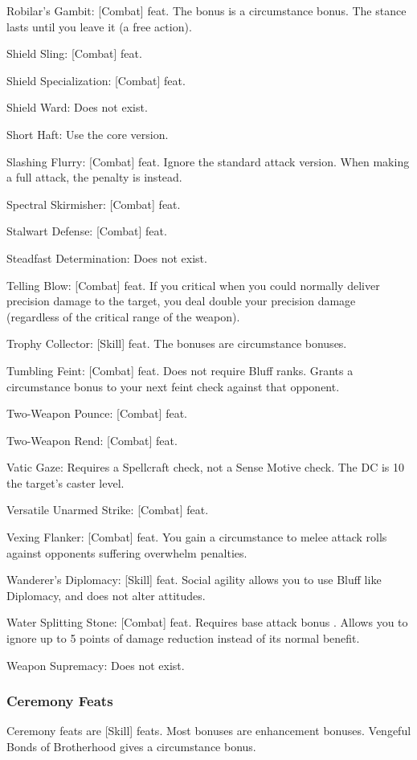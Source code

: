\begin{itemize*}
\item Robilar's Gambit: [Combat] feat. The bonus is a circumstance bonus. The stance lasts until you leave it (a free action).
\item Shield Sling: [Combat] feat.
\item Shield Specialization: [Combat] feat.
\item Shield Ward: Does not exist.
\item Short Haft: Use the core version.
\item Slashing Flurry: [Combat] feat. Ignore the standard attack version. When making a full attack, the penalty is  instead.
\item Spectral Skirmisher: [Combat] feat.
\item Stalwart Defense: [Combat] feat.
\item Steadfast Determination: Does not exist.
\item Telling Blow: [Combat] feat. If you critical when you could normally deliver precision damage to the target, you deal double your precision damage (regardless of the critical range of the weapon).
\item Trophy Collector: [Skill] feat. The bonuses are circumstance bonuses.
\item Tumbling Feint: [Combat] feat. Does not require Bluff ranks. Grants a  circumstance bonus to your next feint check against that opponent.
\item Two-Weapon Pounce: [Combat] feat.
\item Two-Weapon Rend: [Combat] feat.
\item Vatic Gaze: Requires a Spellcraft check, not a Sense Motive check. The DC is 10 \add the target's caster level.
\item Versatile Unarmed Strike: [Combat] feat.
\item Vexing Flanker: [Combat] feat. You gain a  circumstance to melee attack rolls against opponents suffering overwhelm penalties.
\item Wanderer's Diplomacy: [Skill] feat. Social agility allows you to use Bluff like Diplomacy, and does not alter attitudes.
\item Water Splitting Stone: [Combat] feat. Requires base attack bonus . Allows you to ignore up to 5 points of damage reduction instead of its normal benefit.
\item Weapon Supremacy: Does not exist.
\end{itemize*}
\subsubsection{Ceremony Feats}
Ceremony feats are [Skill] feats. Most bonuses are enhancement bonuses. Vengeful Bonds of Brotherhood gives a circumstance bonus.

